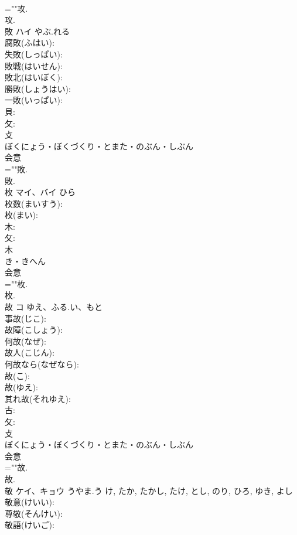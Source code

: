 \documentclass[8pt]{extreport}
\begin{document}
\begin{CJK}{UTF8}{min}
\\	=""攻.
\\	攻.
\\	敗	ハイ	やぶ.れる		
\\	腐敗(ふはい): 
\\	失敗(しっぱい): 
\\	敗戦(はいせん): 
\\	敗北(はいぼく): 
\\	勝敗(しょうはい): 
\\	一敗(いっぱい): 
\\	貝: 
\\	攵: 
\\	攴	
\\	ぼくにょう・ぼくづくり・とまた・のぶん・しぶん	
\\	会意 
\\	=""敗.
\\	敗.
\\	枚	マイ、バイ		ひら	
\\	枚数(まいすう): 
\\	枚(まい): 
\\	木: 
\\	攵: 
\\	木	
\\	き・きへん	
\\	会意 
\\	=""枚.
\\	枚.
\\	故	コ	ゆえ、ふる.い、もと		
\\	事故(じこ): 
\\	故障(こしょう): 
\\	何故(なぜ): 
\\	故人(こじん): 
\\	何故なら(なぜなら): 
\\	故(こ): 
\\	故(ゆえ): 
\\	其れ故(それゆえ): 
\\	古: 
\\	攵: 
\\	攴	
\\	ぼくにょう・ぼくづくり・とまた・のぶん・しぶん	
\\	会意 
\\	=""故.
\\	故.
\\	敬	ケイ、キョウ	うやま.う	け, たか, たかし, たけ, とし, のり, ひろ, ゆき, よし	
\\	敬意(けいい): 
\\	尊敬(そんけい): 
\\	敬語(けいご): 

\end{CJK}
\end{document}
